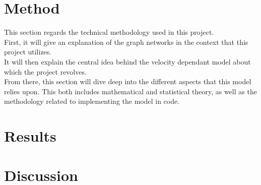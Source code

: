 \documentclass{article}
\begin{document}

\clearpage



\section{Method}
\label{sec:Method}
This section regards the technical methodology used in this project.
\\
First, it will give an explanation of the graph networks in the context that this project utilizes. 
\\
It will then explain the central idea behind the velocity dependant model about which the project revolves. 
\\
From there, this section will dive deep into the different aspects that this model relies upon.
This both includes mathematical and statistical theory, as well as the methodology related to implementing the model in code.









\clearpage


\section{Results}

\clearpage

\clearpage

\clearpage

\section{Discussion}

\clearpage







\clearpage

%
%
\printbibliography
\clearpage


\end{document}
